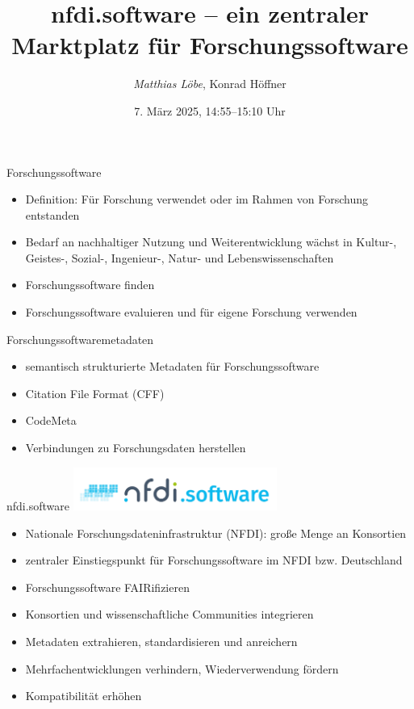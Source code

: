 \documentclass[aspectratio=1610,12pt]{beamer}
\author{\emph{Matthias Löbe}, Konrad Höffner}
\title{\large nfdi.software – ein zentraler Marktplatz für Forschungssoftware}
\date{7. März 2025, 14:55--15:10 Uhr}
\begin{document}
\begin{frame}
\titlepage
\end{frame}

\begin{frame}{Forschungssoftware}
\begin{itemize}
\item Definition: Für Forschung verwendet oder im Rahmen von Forschung entstanden
\item Bedarf an nachhaltiger Nutzung und Weiterentwicklung wächst in Kultur-, Geistes-, Sozial-, Ingenieur-, Natur- und Lebenswissenschaften
\item Forschungssoftware finden
\item Forschungssoftware evaluieren und für eigene Forschung verwenden
\end{itemize}
\end{frame}

\begin{frame}{Forschungssoftwaremetadaten}
\begin{itemize}
\item semantisch strukturierte Metadaten für Forschungssoftware
\item Citation File Format (CFF)
\item CodeMeta
\item Verbindungen zu Forschungsdaten herstellen
\end{itemize}
\end{frame}

\begin{frame}{nfdi.software}
\centering\includegraphics[width=0.5\textwidth,height=0.95\textheight,keepaspectratio]{img/logo.png}
\begin{itemize}
\item Nationale Forschungsdateninfrastruktur (NFDI): große Menge an Konsortien
\item zentraler Einstiegspunkt für Forschungssoftware im NFDI bzw. Deutschland
\item Forschungssoftware FAIRifizieren
\item Konsortien und wissenschaftliche Communities integrieren
\item Metadaten extrahieren, standardisieren und anreichern
\item Mehrfachentwicklungen verhindern, Wiederverwendung fördern
\item Kompatibilität erhöhen
\end{itemize}
\end{frame}
\end{document}
